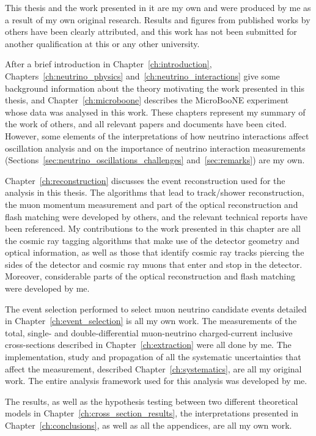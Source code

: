 This thesis and the work presented in it are my own and were produced by me as a result of my own original research. Results and figures from published works by others have been clearly attributed, and this work has not been submitted for another qualification at this or any other university.

After a brief introduction in Chapter~\ref{ch:introduction}, Chapters~\ref{ch:neutrino_physics} and~\ref{ch:neutrino_interactions} give some background information about the theory motivating the work presented in this thesis, and Chapter~\ref{ch:microboone} describes the MicroBooNE experiment whose data was analysed in this work.  These chapters represent my summary of the work of others, and all relevant papers and documents have been cited. However, some elements of the interpretations of how neutrino interactions affect oscillation analysis and on the importance of neutrino interaction measurements (Sections~\ref{sec:neutrino_oscillations_challenges} and~\ref{sec:remarks}) are my own.

Chapter~\ref{ch:reconstruction} discusses the event reconstruction used for the analysis in this thesis. The algorithms that lead to track/shower reconstruction, the muon momentum measurement and part of the optical reconstruction and flash matching were developed by others, and the relevant technical reports have been referenced. My contributions to the work presented in this chapter are all the cosmic ray tagging algorithms that make use of the detector geometry and optical information, as well as those that identify cosmic ray tracks piercing the sides of the detector and cosmic ray muons that enter and stop in the detector. Moreover, considerable parts of the optical reconstruction and flash matching were developed by me.

The event selection performed to select muon neutrino candidate events detailed in Chapter~\ref{ch:event_selection} is all my own work. The measurements of the total, single- and double-differential muon-neutrino charged-current inclusive cross-sections described in Chapter~\ref{ch:extraction} were all done by me. The implementation, study and propagation of all the systematic uncertainties that affect the measurement, described Chapter~\ref{ch:systematics}, are all my original work. The entire analysis framework used for this analysis was developed by me.

The results, as well as the hypothesis testing between two different theoretical models in Chapter~\ref{ch:cross_section_results}, the interpretations presented in Chapter~\ref{ch:conclusions}, as well as all the appendices, are all my own work.